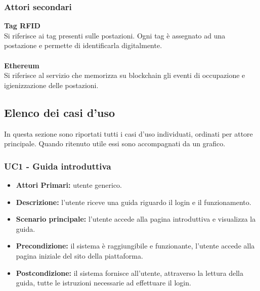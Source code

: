 \subsubsection{Attori secondari}
\textbf{Tag RFID}\\
Si riferisce ai tag presenti sulle postazioni. Ogni tag è assegnato ad una postazione e permette di identificarla digitalmente.\\
\\
\textbf{Ethereum}\\
Si riferisce al servizio che memorizza su blockchain gli eventi di occupazione e igienizzazione delle postazioni.\\

\subsection{Elenco dei casi d'uso}
In questa sezione sono riportati tutti i casi d'uso individuati, ordinati per attore principale. Quando ritenuto utile essi sono accompagnati da un grafico.
\\
\subsubsection{ UC1 - Guida introduttiva}
\begin{itemize}
           	\item\textbf{Attori Primari:} utente generico.
           	\item\textbf{Descrizione:} l'utente riceve una guida riguardo il login e il funzionamento.
           	\item\textbf{Scenario principale:} l’utente accede alla pagina introduttiva e visualizza la guida.
           	\item\textbf{Precondizione:} il sistema è raggiungibile e funzionante, l’utente accede alla pagina iniziale del sito della piattaforma.
           	\item\textbf{Postcondizione:} il sistema fornisce all’utente, attraverso la lettura della guida, tutte le istruzioni necessarie ad effettuare il login.
\end{itemize}

